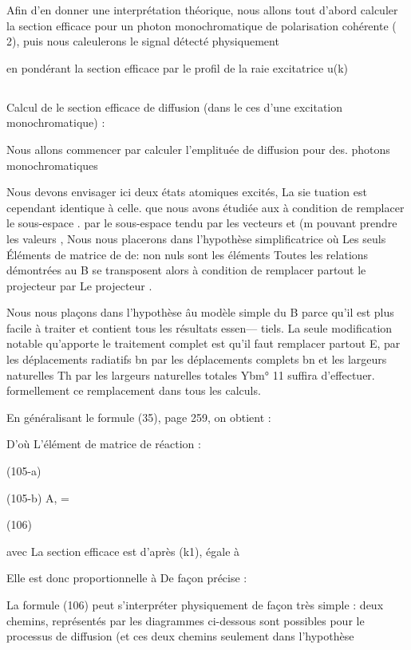 Afin d'en donner une interprétation théorique, nous allons tout
d'abord calculer la section efficace pour un photon monochromatique de polarisation cohérente ( 2), puis nous caleulerons le signal détecté physiquement

en pondérant la section efficace par le profil de la raie excitatrice u(k)

\subsection{} Calcul de le section efficace de diffusion (dans le ces d'une excitation monochromatique) :%



Nous allons commencer par calculer l'emplituée de diffusion
pour des. photons monochromatiques

Nous devons envisager ici deux états atomiques excités, La sie
tuation est cependant identique à celle. que nous avons étudiée aux 
à condition de remplacer le sous-espace . par le sous-espace 
tendu par les vecteurs et (m pouvant prendre les valeurs
, Nous nous placerons dans l'hypothèse simplificatrice où Les seuls
Éléments de matrice de de: non nuls sont les éléments 
Toutes les relations démontrées au  B se transposent alors à condition de
remplacer partout le projecteur  par Le projecteur
.

Nous nous plaçons dans l'hypothèse âu modèle simple du  B
parce qu'il est plus facile à traiter et contient tous les résultats essen—
tiels. La seule modification notable qu'apporte le traitement complet est qu'il
faut remplacer partout E, par  les déplacements radiatifs bn par les
déplacements complets bn et les largeurs naturelles Th par les largeurs naturelles totales Ybm° 11 suffira d'effectuer. formellement ce remplacement dans
tous les calculs.

En généralisant le formule (35), page 259, on obtient :

D'où L'élément de matrice de réaction :

(105-a)


(105-b) A, =

(106)

avec
La section efficace est  d'après (k1), égale à

Elle est donc proportionnelle à De façon précise :

La formule (106) peut s'interpréter physiquement de façon très simple :
deux chemins, représentés par les diagrammes ci-dessous sont possibles pour
le processus de diffusion (et ces deux chemins seulement dans l'hypothèse

